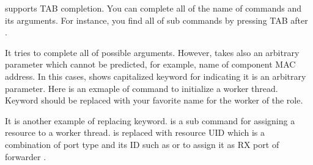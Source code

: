 \documentclass[a4paper,11pt,openany,oneside,english]{sphinxmanual}
\begin{document}
 supports TAB completion. You can complete all of the name
of commands and its arguments. For instance, you find all of sub commands
by pressing TAB after .

\begin{sphinxVerbatim}[commandchars=\\\{\},formatcom=\footnotesize]
\end{sphinxVerbatim}

It tries to complete all of possible arguments. However,  takes
also an arbitrary parameter which cannot be predicted, for example, name of
component MAC address. In this cases,  shows capitalized keyword
for indicating it is an arbitrary parameter. Here is an exmaple of
 command to initialize a worker thread. Keyword  should
be replaced with your favorite name for the worker of the role.

\begin{sphinxVerbatim}[commandchars=\\\{\},formatcom=\footnotesize]
\end{sphinxVerbatim}

It is another example of replacing keyword.  is a sub command for
assigning a resource to a worker thread.  is replaced with
resource UID which is a combination of port type and its ID such as
 or  to assign it as RX port of forwarder .

\begin{sphinxVerbatim}[commandchars=\\\{\},formatcom=\footnotesize]
\end{sphinxVerbatim}
\end{document}
